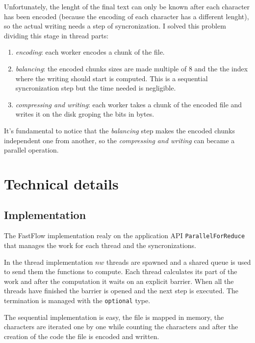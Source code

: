 \documentclass[12pt, letterpaper]{article}
\begin{document}
Unfortunately, the lenght of the final text can only be known after each character has been encoded (because the encoding of each character
has a different lenght), so the actual writing needs a step of syncronization. I solved this problem dividing this stage in thread parts:
\begin{enumerate}
    \item \textit{encoding}: each worker encodes a chunk of the file.
    \item \textit{balancing}: the encoded chunks sizes are made multiple of 8 and the the index where the writing should start is computed. This is a sequential syncronization step but the time needed is negligible.
    \item \textit{compressing and writing}: each worker takes a chunk of the encoded file and writes it on the disk groping the bits in bytes.
\end{enumerate}
It's fundamental to notice that the \textit{balancing} step makes the encoded chunks independent one from another, so the \textit{compressing and writing} can became a parallel operation.


\section{Technical details}

\subsection{Implementation}

The FastFlow implementation realy on the application API \texttt{ParallelForReduce} that manages the work for each thread and the syncronizations.

In the thread implementation $nw$ threads are spawned and a shared queue is used to send them the functions to compute. Each thread calculates its part of the work and after the computation it waits on an explicit barrier. When all the threads have finished the barrier is opened and the next step is executed. The termination is managed with the \texttt{optional} type.

The sequential implementation is easy, the file is mapped in memory, the characters are iterated one by one while counting the characters and after the creation of the code the file is encoded and written.
\end{document}
